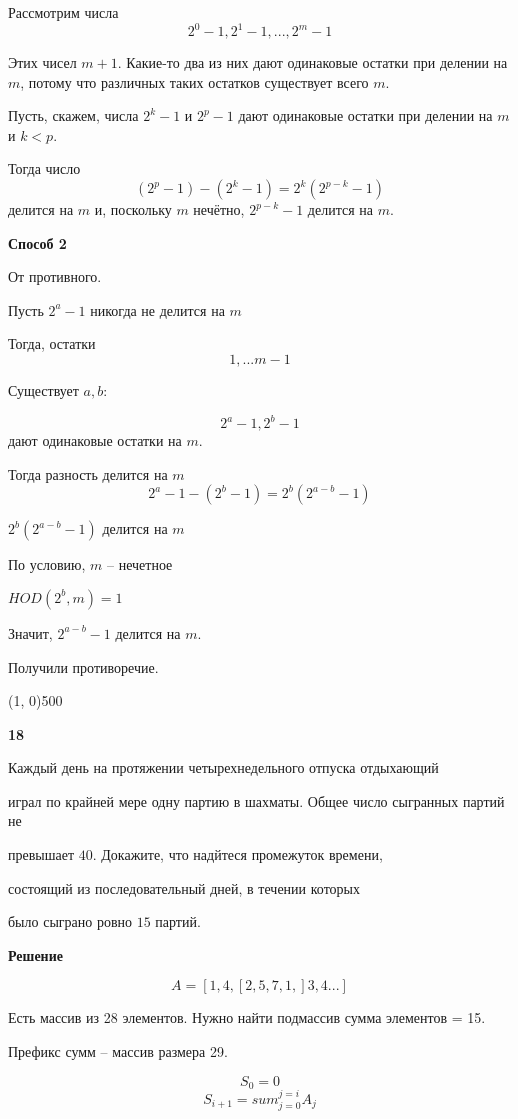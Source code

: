 \documentclass{article}
\begin{document}
Рассмотрим числа  $$2^0 - 1,  2^1 - 1,  ...,  2^m - 1$$

Этих чисел  $m + 1$.  Какие-то два из них дают одинаковые остатки при делении на $m$, потому что различных таких остатков существует всего $m$. 

Пусть, скажем, числа  $2^k - 1$  и  $2^p - 1$  дают одинаковые остатки при делении на $m$ и  $k < p$.  

Тогда число  $$(2^p - 1) - (2^k -1) = 2^k(2^{p-k} - 1)$$  делится на $m$ и, поскольку $m$ нечётно,  $2^{p - k} - 1$  делится на $m$.

\textbf{Способ 2}

От противного. 

Пусть $2^a - 1$ никогда не делится на  $m$

Тогда, остатки $$ 1, ... m- 1$$

Существует $a, b$:

$$2^a - 1, 2^b - 1$$ 
дают одинаковые остатки на $m$.

Тогда разность делится на $m$
$$2^a - 1 - (2^b - 1) = 2^b (2^{a -b} - 1)$$

$2^b (2^{a -b} - 1)$ делится на $m$

По условию, $m$ -- нечетное

$HOD(2^ b, m) = 1$ 

Значит, $2^{a -b} - 1$ делится на $m$.

Получили противоречие.



\line(1, 0){500}



\textbf{18}

Каждый день на протяжении четырехнедельного отпуска отдыхающий

играл по крайней мере одну партию в шахматы. Общее число сыгранных партий не 

превышает $40$. Докажите, что надйтеся промежуток времени, 

состоящий из последовательный дней, в течении которых 

было сыграно ровно  $15 $ партий. 

\textbf{Решение}

$$A = [1, 4, [2, 5, 7, 1,] 3, 4  ... ]$$

Есть массив из 28 элементов. Нужно найти подмассив сумма элементов = 15.

Префикс сумм -- массив размера 29.

$$S_0 = 0$$
$$ S_{i + 1} = sum_{j = 0}^{j = i} A_j$$ 
\end{document}

